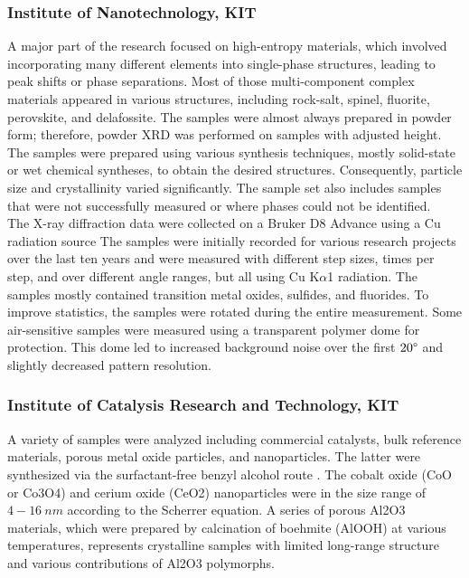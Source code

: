 \subsubsection*{Institute of Nanotechnology, KIT}

A major part of the research focused on high-entropy materials, which involved incorporating many different elements into single-phase structures, leading to peak shifts or phase separations. Most of those multi-component complex materials appeared in various structures, including rock-salt, spinel, fluorite, perovskite, and delafossite. The samples were almost always prepared in powder form; therefore, powder XRD was performed on samples with adjusted height. The samples were prepared using various synthesis techniques, mostly solid-state or wet chemical syntheses, to obtain the desired structures. Consequently, particle size and crystallinity varied significantly. The sample set also includes samples that were not successfully measured or where phases could not be identified. \\

The X-ray diffraction data were collected on a Bruker D8 Advance using a Cu radiation source  The samples were initially recorded for various research projects over the last ten years and were measured with different step sizes, times per step, and over different angle ranges, but all using Cu K$\alpha$1 radiation. The samples mostly contained transition metal oxides, sulfides, and fluorides. To improve statistics, the samples were rotated during the entire measurement. Some air-sensitive samples were measured using a transparent polymer dome for protection. This dome led to increased background noise over the first $20\degree$ and slightly decreased pattern resolution. \\ 

\subsubsection*{Institute of Catalysis Research and Technology, KIT}

A variety of samples were analyzed including commercial catalysts, bulk reference materials, porous metal oxide particles, and nanoparticles. The latter were synthesized via the surfactant-free benzyl alcohol route \cite{Wolf2019, Wolf2018}. The cobalt oxide (CoO or Co3O4) and cerium oxide (CeO2) nanoparticles were in the size range of $4-16 \ \si{nm}$ according to the Scherrer equation. A series of porous Al2O3 materials, which were prepared by calcination of boehmite (AlOOH) at various temperatures, represents crystalline samples with limited long-range structure and various contributions of Al2O3 polymorphs.\\

